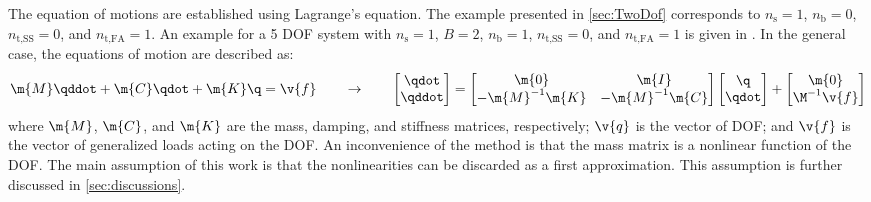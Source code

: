 \documentclass[wes, manuscript]{copernicus}
\begin{document}
The equation of motions are established using Lagrange's equation. 
The example presented in \autoref{sec:TwoDof} corresponds to
 $n_\text{s}=1$, $n_\text{b}=0$, $n_\text{t,SS}=0$, and $n_\text{t,FA}=1$.
% 
An example for a 5 DOF system with $n_\text{s}=1$, $B=2$, $n_\text{b}=1$,
$n_\text{t,SS}=0$, and $n_\text{t,FA}=1$ is given in \cite{branlard:2019flex}.
In the general case, the equations of motion are described as:
\begin{align}
\m{M} \qddot
+\m{C} \qdot
+\m{K} \q
=\v{f}
\qquad\rightarrow\qquad
    \begin{bmatrix}
    \qdot\\
    \qddot\\
    \end{bmatrix} =
    \begin{bmatrix}
      \m{0}             &  \m{I}\\
       -\m{M}^{-1}\m{K} &  -\m{M}^{-1}\m{C}\\
    \end{bmatrix}
    \begin{bmatrix}
    \q \\
    \qdot\\
    \end{bmatrix} 
    +
    \begin{bmatrix}
        \m{0} \\
        \M^{-1} \v{f}\\
    \end{bmatrix}
        \label{eq:MechanicalSystem}
% 
\end{align}
where $\m{M}$, $\m{C}$, and $\m{K}$ are the mass, damping, and stiffness matrices, respectively; 
$\v{q}$ is the vector of DOF; and $\v{f}$ is the vector of generalized loads acting on the DOF.
An inconvenience of the method is that the mass matrix is a nonlinear function of the DOF.
The main assumption of this work is that the nonlinearities can be discarded as a first approximation. This assumption is further discussed in \autoref{sec:discussions}.

\end{document}

